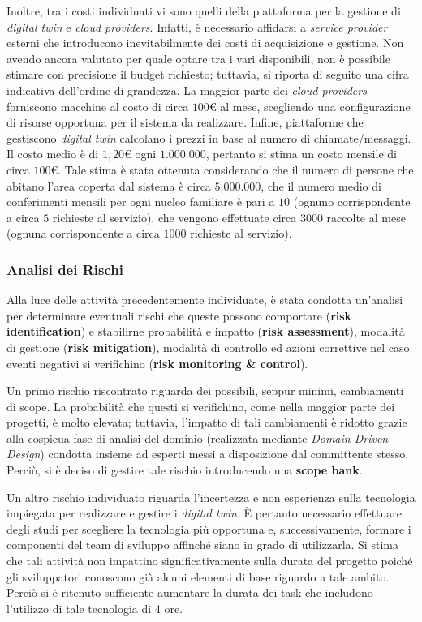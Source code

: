 Inoltre, tra i costi individuati vi sono quelli della piattaforma per la gestione di \textit{digital twin} e \textit{cloud providers}.
Infatti, è necessario affidarsi a \textit{service provider} esterni che introducono inevitabilmente dei costi di acquisizione e gestione.
Non avendo ancora valutato per quale optare tra i vari disponibili, non è possibile stimare con precisione il budget richiesto; tuttavia, si riporta di seguito una cifra indicativa dell'ordine di grandezza.
La maggior parte dei \textit{cloud providers} forniscono macchine al costo di circa $100$\euro{} al mese, scegliendo una configurazione di risorse opportuna per il sistema da realizzare.
Infine, piattaforme che gestiscono \textit{digital twin} calcolano i prezzi in base al numero di chiamate/messaggi.
Il costo medio è di $1,20$\euro{} ogni $1.000.000$, pertanto si stima un costo mensile di circa $100$\euro.
Tale stima è stata ottenuta considerando che il numero di persone che abitano l'area coperta dal sistema è circa $5.000.000$, che il numero medio di conferimenti mensili per ogni nucleo familiare è pari a $10$ (ognuno corrispondente a circa $5$ richieste al servizio), che vengono effettuate circa $3000$ raccolte al mese (ognuna corrispondente a circa $1000$ richieste al servizio).

\subsubsection{Analisi dei Rischi}\label{sec:analisi-dei-rischi}
Alla luce delle attività precedentemente individuate, è stata condotta un'analisi per determinare eventuali rischi che queste possono comportare (\textbf{risk identification}) e stabilirne probabilità e impatto (\textbf{risk assessment}), modalità di gestione (\textbf{risk mitigation}), modalità di controllo ed azioni correttive nel caso eventi negativi si verifichino (\textbf{risk monitoring \& control}).

Un primo rischio riscontrato riguarda dei possibili, seppur minimi, cambiamenti di scope.
La probabilità che questi si verifichino, come nella maggior parte dei progetti, è molto elevata; tuttavia, l'impatto di tali cambiamenti è ridotto grazie alla cospicua fase di analisi del dominio (realizzata mediante \textit{Domain Driven Design}) condotta insieme ad esperti messi a disposizione dal committente stesso.
Perciò, si è deciso di gestire tale rischio introducendo una \textbf{scope bank}.

Un altro rischio individuato riguarda l'incertezza e non esperienza sulla tecnologia impiegata per realizzare e gestire i \textit{digital twin}.
È pertanto necessario effettuare degli studi per scegliere la tecnologia più opportuna e, successivamente, formare i componenti del team di sviluppo affinché siano in grado di utilizzarla.
Si stima che tali attività non impattino significativamente sulla durata del progetto poiché gli sviluppatori conoscono già alcuni elementi di base riguardo a tale ambito.
Perciò si è ritenuto sufficiente aumentare la durata dei task che includono l'utilizzo di tale tecnologia di 4 ore.

